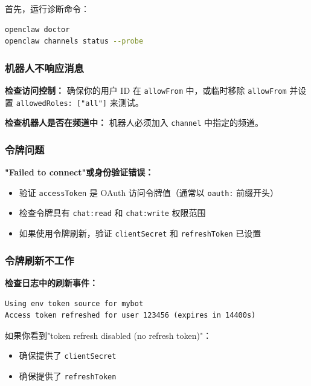 首先，运行诊断命令：

\begin{lstlisting}[language=bash]
openclaw doctor
openclaw channels status --probe
\end{lstlisting}


\subsubsection{机器人不响应消息}


\textbf{检查访问控制：} 确保你的用户 ID 在 \texttt{allowFrom} 中，或临时移除 \texttt{allowFrom} 并设置 \texttt{allowedRoles: ["all"]} 来测试。

\textbf{检查机器人是否在频道中：} 机器人必须加入 \texttt{channel} 中指定的频道。

\subsubsection{令牌问题}


\textbf{"Failed to connect"或身份验证错误：}

\begin{itemize}
  \item 验证 \texttt{accessToken} 是 OAuth 访问令牌值（通常以 \texttt{oauth:} 前缀开头）
  \item 检查令牌具有 \texttt{chat:read} 和 \texttt{chat:write} 权限范围
  \item 如果使用令牌刷新，验证 \texttt{clientSecret} 和 \texttt{refreshToken} 已设置
\end{itemize}


\subsubsection{令牌刷新不工作}


\textbf{检查日志中的刷新事件：}

\begin{lstlisting}
Using env token source for mybot
Access token refreshed for user 123456 (expires in 14400s)
\end{lstlisting}


如果你看到"token refresh disabled (no refresh token)"：

\begin{itemize}
  \item 确保提供了 \texttt{clientSecret}
  \item 确保提供了 \texttt{refreshToken}
\end{itemize}


